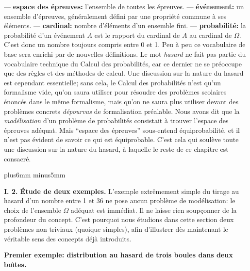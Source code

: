 \smallskip 
--- {\bf espace des \'epreuves:} l'ensemble de toutes les \'epreuves. 
\smallskip 
--- {\bf \'ev\'enement:} un ensemble d'\'epreuves, g\'en\'eralement  
d\'efini par une propri\'et\'e commune \`a ses \'el\'ements. 
\smallskip 
--- {\bf cardinal:}  nombre d'\'el\'ements d'un ensemble fini. 
\smallskip 
--- {\bf probabilit\'e:} la probabilit\'e d'un \'ev\'enement $A$ est le  
rapport du cardinal de $A$ au cardinal de $\Omega$. C'est donc un 
nombre toujours compris entre 0 et 1. 
\medskip 
Peu \`a peu ce vocabulaire de base sera enrichi par de nouvelles 
d\'efinitions. 
\medskip 
Le mot {\it hasard} ne fait pas partie du vocabulaire technique du  
Calcul des probabilit\'es, car ce dernier ne se pr\'eoccupe que des  
r\`egles et des m\'ethodes de calcul. Une discussion sur la nature du 
hasard est cependant essentielle; sans cela, le Calcul des probabilit\'es 
n'est qu'un formalisme vide, qu'on saura utiliser pour r\'esoudre des 
probl\`emes scolaires \'enonc\'es dans le m\^eme formalisme, mais 
qu'on ne saura  plus utiliser devant des probl\`emes concrets {\it 
d\'epourvus} de formalisation pr\'ealable. Nous avons dit que la {\it 
mod\'elisation} d'un probl\`eme de probabilit\'es consistait \`a trouver 
l'espace des \'epreuves ad\'equat. Mais ``espace des \'epreuves'' 
sous-entend \'equiprobabilit\'e, et il n'est pas \'evident de savoir ce qui 
est \'equiprobable. C'est cela qui soul\`eve toute une discussion sur la 
nature du hasard, \`a laquelle le reste de ce chapitre est consacr\'e.  
 
\vskip7mm plus6mm minus5mm
 
{\bf I. 2. \'Etude de deux exemples.} 
\medskip 
L'exemple extr\^emement simple du tirage au hasard d'un nombre entre 1 
et 36 ne pose aucun probl\`eme de mod\'elisation: le choix de l'ensemble 
$\Omega$ ad\'equat est imm\'ediat. Il ne laisse rien soup\c conner de la 
profondeur du concept. C'est pourquoi nous \'etudions dans cette section 
deux probl\`emes non triviaux (quoique simples), afin d'illustrer d\`es 
maintenant le v\'eritable sens des concepts d\'ej\`a introduits. 

\bigskip 

{\bf Premier exemple: distribution au hasard de trois boules dans deux 
bo\^\i tes.} 
 
